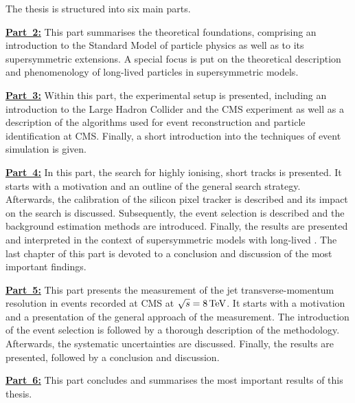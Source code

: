 \noindent The thesis is structured into six main parts.
\begin{description} 
\item \textbf{\hyperref[part:Theory]{Part~2:}} This part summarises the theoretical foundations, comprising an introduction to the Standard Model of particle physics as well as to its supersymmetric extensions. A special focus is put on the theoretical description and phenomenology of long-lived particles in supersymmetric models. 
\item \textbf{\hyperref[part:Experiment]{Part~3:}} Within this part, the experimental setup is  presented, including an introduction to the Large Hadron Collider and the CMS experiment as well as a description of the algorithms used for event reconstruction and particle identification at CMS. Finally, a short introduction into the techniques of event simulation is given.
\item \textbf{\hyperref[part:analysis]{Part~4:}}  In this part, the search for highly ionising, short tracks is presented. It starts with a motivation and an outline of the general search strategy. Afterwards, the calibration of the silicon pixel tracker is described and its impact on the search is discussed. Subsequently, the event selection is described and the background estimation methods are introduced. Finally, the results are presented and interpreted in the context of supersymmetric models with long-lived \chipm. The last chapter of this part is devoted to a conclusion and discussion of the most important findings.
\item \textbf{\hyperref[part:resolution]{Part~5:}} This part presents the measurement of the jet transverse-momentum resolution in \GAMJET events recorded at CMS at $\sqrt{s}=8\,\text{Te}\kern-0.06667em\text{V}$. It starts with a motivation and a presentation of the general approach of the measurement. The introduction of the event selection is followed by a thorough description of the methodology. Afterwards, the systematic uncertainties are discussed. Finally, the results are presented, followed by a conclusion and discussion.
\item \textbf{\hyperref[part:Summary]{Part~6:}} This part concludes and summarises the most important results of this thesis. 
\end{description}

